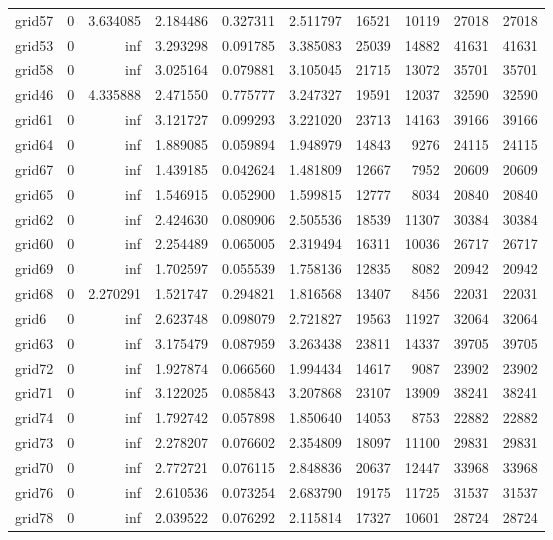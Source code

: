 \begin{longtable}{|l|r|r|r|r|r|r|r|r|r|}
grid57 & 0 & 3.634085 & 2.184486 & 0.327311 & 2.511797 & 16521 & 10119 & 27018 & 27018 \\
grid53 & 0 & inf & 3.293298 & 0.091785 & 3.385083 & 25039 & 14882 & 41631 & 41631 \\
grid58 & 0 & inf & 3.025164 & 0.079881 & 3.105045 & 21715 & 13072 & 35701 & 35701 \\
grid46 & 0 & 4.335888 & 2.471550 & 0.775777 & 3.247327 & 19591 & 12037 & 32590 & 32590 \\
grid61 & 0 & inf & 3.121727 & 0.099293 & 3.221020 & 23713 & 14163 & 39166 & 39166 \\
grid64 & 0 & inf & 1.889085 & 0.059894 & 1.948979 & 14843 & 9276 & 24115 & 24115 \\
grid67 & 0 & inf & 1.439185 & 0.042624 & 1.481809 & 12667 & 7952 & 20609 & 20609 \\
grid65 & 0 & inf & 1.546915 & 0.052900 & 1.599815 & 12777 & 8034 & 20840 & 20840 \\
grid62 & 0 & inf & 2.424630 & 0.080906 & 2.505536 & 18539 & 11307 & 30384 & 30384 \\
grid60 & 0 & inf & 2.254489 & 0.065005 & 2.319494 & 16311 & 10036 & 26717 & 26717 \\
grid69 & 0 & inf & 1.702597 & 0.055539 & 1.758136 & 12835 & 8082 & 20942 & 20942 \\
grid68 & 0 & 2.270291 & 1.521747 & 0.294821 & 1.816568 & 13407 & 8456 & 22031 & 22031 \\
grid6 & 0 & inf & 2.623748 & 0.098079 & 2.721827 & 19563 & 11927 & 32064 & 32064 \\
grid63 & 0 & inf & 3.175479 & 0.087959 & 3.263438 & 23811 & 14337 & 39705 & 39705 \\
grid72 & 0 & inf & 1.927874 & 0.066560 & 1.994434 & 14617 & 9087 & 23902 & 23902 \\
grid71 & 0 & inf & 3.122025 & 0.085843 & 3.207868 & 23107 & 13909 & 38241 & 38241 \\
grid74 & 0 & inf & 1.792742 & 0.057898 & 1.850640 & 14053 & 8753 & 22882 & 22882 \\
grid73 & 0 & inf & 2.278207 & 0.076602 & 2.354809 & 18097 & 11100 & 29831 & 29831 \\
grid70 & 0 & inf & 2.772721 & 0.076115 & 2.848836 & 20637 & 12447 & 33968 & 33968 \\
grid76 & 0 & inf & 2.610536 & 0.073254 & 2.683790 & 19175 & 11725 & 31537 & 31537 \\
grid78 & 0 & inf & 2.039522 & 0.076292 & 2.115814 & 17327 & 10601 & 28724 & 28724 \\

\end{longtable}
